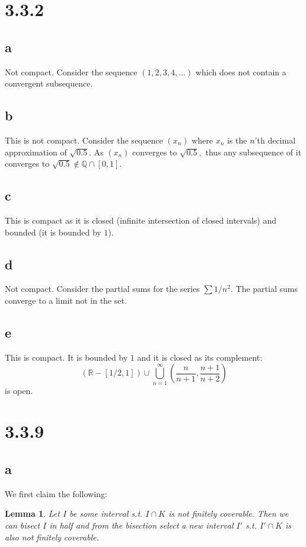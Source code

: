 \documentclass[10pt]{article}
\newtheorem{lemma}[theorem]{Lemma}
\begin{document}
\section*{3.3.2}
\subsection*{a}
Not compact. Consider the sequence $(1,2,3,4,...)$ which does not contain a convergent subsequence.

\subsection*{b}
This is not compact. Consider the sequence $(x_n)$ where $x_n$ is the $n$'th decimal approximation of $\sqrt{0.5}.$ As $(x_n)$ converges to $\sqrt{0.5},$ thus any subsequence of it converges to $\sqrt{0.5}\notin\mathbb{Q}\cap[0,1].$

\subsection*{c}
This is compact as it is closed (infinite intersection of closed intervals) and bounded (it is bounded by $1$).

\subsection*{d}
Not compact. Consider the partial sums for the series $\sum 1/n^2.$ The partial sums converge to a limit not in the set.

\subsection*{e}
This is compact. It is bounded by $1$ and it is closed as its complement:
\[(\mathbb{R}-[1/2,1])\cup \bigcup_{n=1}^\infty \left (\frac{n}{n+1},\frac{n+1}{n+2}\right )\]
is open.

\section*{3.3.9}

\subsection*{a}

We first claim the following: 
\begin{lemma}
    Let $I$ be some interval s.t. $I\cap K$ is not finitely coverable. Then we can bisect $I$ in half and from the bisection select a new interval $I'$ s.t. $I'\cap K$ is also not finitely coverable.
\end{lemma}
\end{document}
